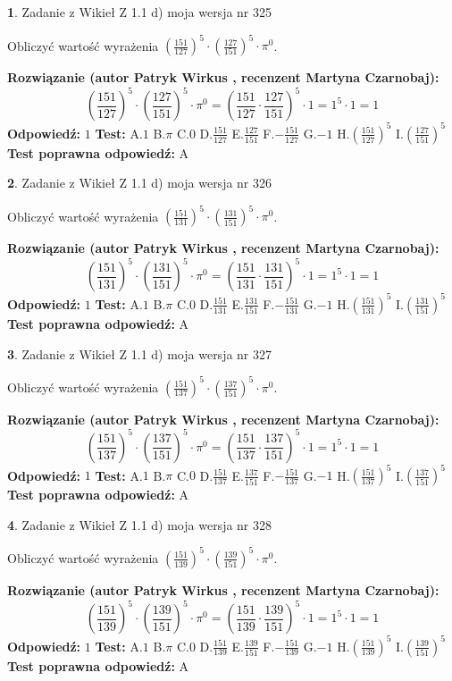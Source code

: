 \documentclass[12pt, a4paper]{article}
\theoremstyle{definition} %
\newtheorem{zad}{}
\newcommand{\zadStart}[1]{\begin{zad}#1\newline}
\newcommand{\zadStop}{\end{zad}}
\newcommand{\rozwStart}[2]{\noindent \textbf{Rozwiązanie (autor #1 , recenzent #2): }\newline}
\newcommand{\rozwStop}{\newline}
\newcommand{\odpStart}{\noindent \textbf{Odpowiedź:}\newline}
\newcommand{\odpStop}{\newline}
\newcommand{\testStart}{\noindent \textbf{Test:}\newline}
\newcommand{\testStop}{\newline}
\newcommand{\kluczStart}{\noindent \textbf{Test poprawna odpowiedź:}\newline}
\newcommand{\kluczStop}{\newline}
\begin{document}
\zadStart{Zadanie z Wikieł Z 1.1 d) moja wersja nr 325}

Obliczyć wartość wyrażenia $(\frac{151}{127})^{5} \cdot (\frac{127}{151})^{5} \cdot \pi^{0}$.
\zadStop
\rozwStart{Patryk Wirkus}{Martyna Czarnobaj}
$$(\frac{151}{127})^{5} \cdot (\frac{127}{151})^{5} \cdot \pi^{0} = (\frac{151}{127} \cdot \frac{127}{151})^{5} \cdot 1 = 1^{5} \cdot 1 = 1$$
\rozwStop
\odpStart
$1$
\odpStop
\testStart
A.$1$ B.$\pi$ C.$0$ D.$\frac{151}{127}$ E.$\frac{127}{151}$
F.$-\frac{151}{127}$ G.$-1$
H.$(\frac{151}{127})^{5}$
I.$(\frac{127}{151})^{5}$
\testStop
\kluczStart
A
\kluczStop



\zadStart{Zadanie z Wikieł Z 1.1 d) moja wersja nr 326}

Obliczyć wartość wyrażenia $(\frac{151}{131})^{5} \cdot (\frac{131}{151})^{5} \cdot \pi^{0}$.
\zadStop
\rozwStart{Patryk Wirkus}{Martyna Czarnobaj}
$$(\frac{151}{131})^{5} \cdot (\frac{131}{151})^{5} \cdot \pi^{0} = (\frac{151}{131} \cdot \frac{131}{151})^{5} \cdot 1 = 1^{5} \cdot 1 = 1$$
\rozwStop
\odpStart
$1$
\odpStop
\testStart
A.$1$ B.$\pi$ C.$0$ D.$\frac{151}{131}$ E.$\frac{131}{151}$
F.$-\frac{151}{131}$ G.$-1$
H.$(\frac{151}{131})^{5}$
I.$(\frac{131}{151})^{5}$
\testStop
\kluczStart
A
\kluczStop



\zadStart{Zadanie z Wikieł Z 1.1 d) moja wersja nr 327}

Obliczyć wartość wyrażenia $(\frac{151}{137})^{5} \cdot (\frac{137}{151})^{5} \cdot \pi^{0}$.
\zadStop
\rozwStart{Patryk Wirkus}{Martyna Czarnobaj}
$$(\frac{151}{137})^{5} \cdot (\frac{137}{151})^{5} \cdot \pi^{0} = (\frac{151}{137} \cdot \frac{137}{151})^{5} \cdot 1 = 1^{5} \cdot 1 = 1$$
\rozwStop
\odpStart
$1$
\odpStop
\testStart
A.$1$ B.$\pi$ C.$0$ D.$\frac{151}{137}$ E.$\frac{137}{151}$
F.$-\frac{151}{137}$ G.$-1$
H.$(\frac{151}{137})^{5}$
I.$(\frac{137}{151})^{5}$
\testStop
\kluczStart
A
\kluczStop



\zadStart{Zadanie z Wikieł Z 1.1 d) moja wersja nr 328}

Obliczyć wartość wyrażenia $(\frac{151}{139})^{5} \cdot (\frac{139}{151})^{5} \cdot \pi^{0}$.
\zadStop
\rozwStart{Patryk Wirkus}{Martyna Czarnobaj}
$$(\frac{151}{139})^{5} \cdot (\frac{139}{151})^{5} \cdot \pi^{0} = (\frac{151}{139} \cdot \frac{139}{151})^{5} \cdot 1 = 1^{5} \cdot 1 = 1$$
\rozwStop
\odpStart
$1$
\odpStop
\testStart
A.$1$ B.$\pi$ C.$0$ D.$\frac{151}{139}$ E.$\frac{139}{151}$
F.$-\frac{151}{139}$ G.$-1$
H.$(\frac{151}{139})^{5}$
I.$(\frac{139}{151})^{5}$
\testStop
\kluczStart
A
\kluczStop
\end{document}

